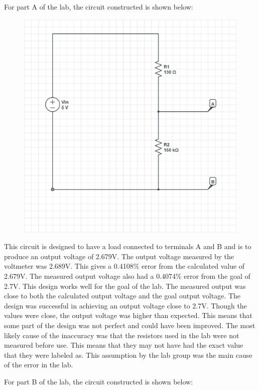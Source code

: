 \documentclass[twocolumn, amsmath]{revtex4}
\begin{document}
For part A of the lab, the circuit constructed is shown below:

\begin{figure}[h]  
\includegraphics[scale = 0.3]{DIAGRAM1lab1.eps}  
\graphicspath{ {/home/evin/Desktop/School/Circuits/lab1/} }
\end{figure}

This circuit is designed to have a load connected to terminals A and B and is to produce an output voltage of 2.679V. The output voltage measured by the voltmeter was 2.689V. This gives a 0.4108\% error from the calculated value of 2.679V. The measured output voltage also had a 0.4074\% error from the goal of 2.7V. This design works well for the goal of the lab. The measured output was close to both the calculated output voltage and the goal output voltage. The design was successful in achieving an output voltage close to 2.7V. Though the values were close, the output voltage was higher than expected. This means that some part of the design was not perfect and could have been improved. The most likely cause of the inaccuracy was that the resistors used in the lab were not measured before use. This means that they may not have had the exact value that they were labeled as. This assumption by the lab group was the main cause of the error in the lab.

For part B of the lab, the circuit constructed is shown below:
\end{document}
